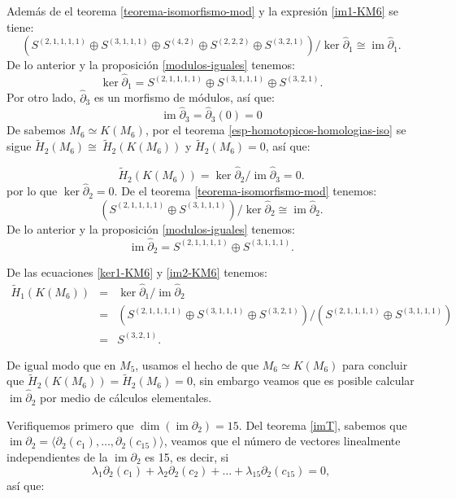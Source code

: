 \documentclass[12pt]{book}
\theoremstyle{definition}
\DeclareMathOperator{\im}{im}
\newcounter{in}
\begin{document}
Además de el teorema \ref{teorema-isomorfismo-mod} y la expresión \ref{im1-KM6} se tiene:
$$(S^{(2,1,1,1,1)}\oplus S^{(3,1,1,1)}\oplus S^{(4,2)}\oplus
      S^{(2,2,2)}\oplus S^{(3,2,1)})/\ker \widehat\partial_{1}\cong \im \widehat\partial_{1}.$$
De lo anterior y la proposición \ref{modulos-iguales} tenemos:
\begin{equation}
  \label{ker1-KM6}
  \ker \widehat\partial_{1}=S^{(2,1,1,1,1)}\oplus S^{(3,1,1,1)}\oplus S^{(3,2,1)}.
\end{equation}
Por otro lado, $\widehat\partial_{3}$ es un morfismo de módulos, así que:
\begin{equation*}
\im\widehat\partial_{3}=\widehat\partial_{3}(0)=0
\label{im3-KM6}
\end{equation*}
De \cite{larrion2009clique} sabemos $M_{6}\simeq K(M_{6})$,
por el teorema \ref{esp-homotopicos-homologias-iso} se sigue $\widetilde H_{2}(M_{6})\cong~\widetilde H_{2}(K(M_{6}))$ y  $\widetilde
H_{2}(M_{6})=0$, así que:

\begin{equation*}
\widetilde H_{2}(K(M_{6}))=\ker \widehat\partial_{2}/\im \widehat\partial_{3}=0.
\end{equation*}
por lo que $\ker \widehat\partial_{2}=0$. De el teorema
\ref{teorema-isomorfismo-mod} tenemos:
$$(S^{(2,1,1,1,1)}\oplus S^{(3,1,1,1)})/\ker \widehat\partial_{2}\cong \im
\widehat\partial_{2}.$$
De lo anterior y la proposición \ref{modulos-iguales} tenemos:
\begin{equation}
  \im \widehat\partial_{2}=S^{(2,1,1,1,1)}\oplus S^{(3,1,1,1)}.
  \label{im2-KM6}
\end{equation}

De las ecuaciones \ref{ker1-KM6} y \ref{im2-KM6} tenemos:
\begin{eqnarray*}
  \widetilde H_{1}(K(M_{6}))&=&\ker \widehat\partial_{1}/\im
  \widehat\partial_{2}\\
  &=&(S^{(2,1,1,1,1)}\oplus S^{(3,1,1,1)}\oplus
  S^{(3,2,1)})/(S^{(2,1,1,1,1)}\oplus S^{(3,1,1,1)})\\
  &=&S^{(3,2,1)}.
\end{eqnarray*}

De igual modo que en $M_{5}$, usamos el hecho de que $M_{6}\simeq K(M_{6})$  para
concluir que $\widetilde H_{2}(K(M_{6}))=\widetilde H_{2}(M_{6})=0$, sin embargo veamos que 
es posible calcular $\im \widehat\partial_{2}$ por medio de cálculos elementales.

Verifiquemos primero que $\dim(\im \partial_{2})=15$. Del teorema
\ref{imT}, sabemos que
$\im \partial_{2}=\langle\partial_{2}(c_{1}),\ldots,\partial_{2}(c_{15})\rangle$,
veamos que el número de vectores linealmente independientes de la
$\im \partial_{2}$ es 15, es
decir, si
$$\lambda_{1}\partial_{2}(c_{1})+\lambda_{2}\partial_{2}(c_{2})+\ldots+\lambda_{15}\partial_{2}(c_{15})=0,$$
así que:
\end{document}
